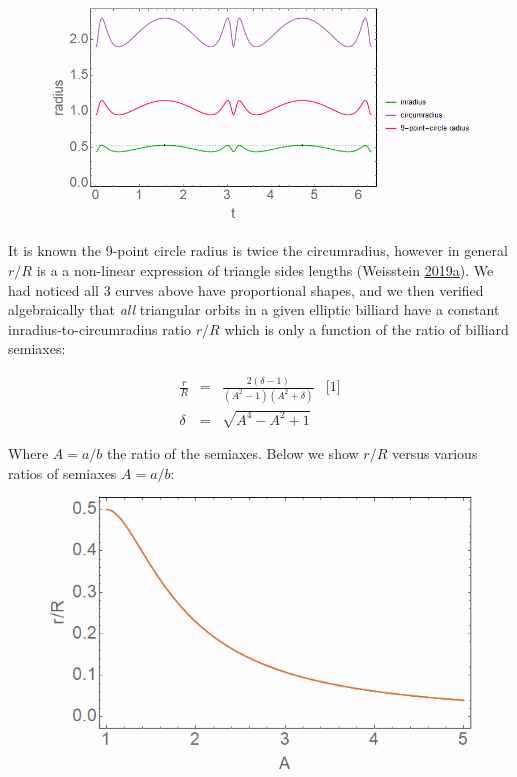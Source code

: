 \documentclass[]{article}
\begin{document}
\begin{figure}[H]

{\centering \includegraphics[width=0.75\linewidth]{pics/r_over_R_vs_t} 

}

\end{figure}

It is known the 9-point circle radius is twice the circumradius, however in general \(r/R\) is a a non-linear expression of triangle sides lengths (Weisstein \protect\hyperlink{ref-mw}{2019}\protect\hyperlink{ref-mw}{a}). We had noticed all 3 curves above have proportional shapes, and we then verified algebraically that \emph{all} triangular orbits in a given elliptic billiard have a constant inradius-to-circumradius ratio \(r/R\) which is only a function of the ratio of billiard semiaxes:

\[
\begin{array}{rcll}
\frac{r}{R}&=&\frac{2(\delta-1)}{(A^2-1)(A^2+\delta)}&\mbox{[1]}\\
\delta&=&\sqrt{A^4-A^2+1}
\end{array}
\]

Where \(A=a/b\) the ratio of the semiaxes. Below we show \(r/R\) versus various ratios of semiaxes \(A=a/b\):

\begin{figure}[H]

{\centering \includegraphics[width=0.5\linewidth]{pics/r_over_R_curve} 

}

\end{figure}
\end{document}
